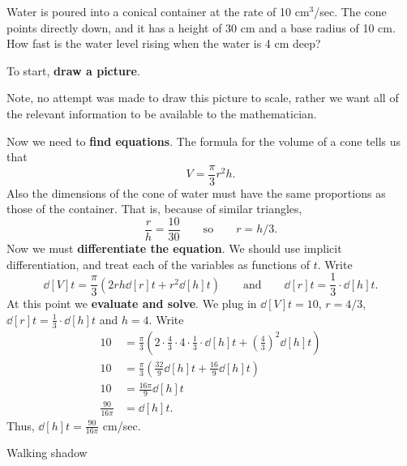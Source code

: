 \documentclass{ximera}
\begin{document}
\begin{example} Water is poured into a conical container at the rate of 10
cm${}^3$/sec.  The cone points directly down, and it has a height of
30 cm and a base radius of 10 cm.  How fast is the water level rising
when the water is 4 cm deep?

\begin{explanation}
To start, \textbf{draw a picture}.
\begin{image}
\end{image}
Note, no attempt was made to draw this picture to scale, rather we
want all of the relevant information to be available to the
mathematician.

Now we need to \textbf{find equations}. The formula for the volume of a cone tells us that 
\[
V = \frac{\pi}{3} r^2 h.
\]
Also the dimensions of the cone of water must have the same
proportions as those of the container.  That is, because of similar
triangles,
\[
\frac{r}{h}=\frac{10}{30} \qquad\text{so}\qquad r={h/3}.
\]  
Now we must \textbf{differentiate the equation}. We should use implicit differentiation, and treat each of the variables as functions of $t$. Write
\[
\dd[V]{t} = \frac{\pi}{3}\left(2rh \dd[r]{t} + r^2 \dd[h]{t}\right)
\qquad\text{and}\qquad \dd[r]{t} = \frac{1}{3}\cdot \dd[h]{t}.
\]
At this point we \textbf{evaluate and solve}. We plug in $\dd[V]{t} =
10$, $r = 4/3$, $\dd[r]{t} = \frac{1}{3}\cdot \dd[h]{t}$ and
$h=4$. Write
\begin{align*}
10 &= \frac{\pi}{3}\left(2\cdot \frac{4}{3}\cdot 4 \cdot\frac{1}{3}\cdot\dd[h]{t} + \left(\frac{4}{3}\right)^2 \dd[h]{t}\right)\\
10 &= \frac{\pi}{3}\left(\frac{32}{9}\dd[h]{t} + \frac{16}{9} \dd[h]{t}\right)\\
10 &= \frac{16\pi}{9}\dd[h]{t}\\
\frac{90}{16\pi} &= \dd[h]{t}.
\end{align*}
Thus, $\dd[h]{t}=\frac{90}{16\pi}$ cm/sec.
\end{explanation}
\end{example}


Walking shadow
\end{document}

